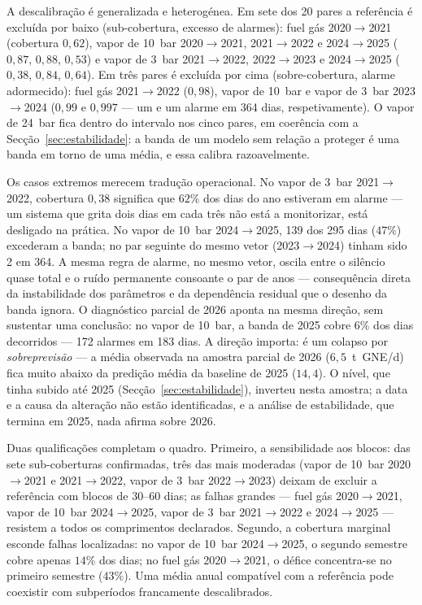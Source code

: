 A descalibração é generalizada e heterogénea. Em sete dos 20 pares a
referência é excluída por baixo (sub-cobertura, excesso de alarmes): fuel gás
2020${\to}$2021 (cobertura $0{,}62$), vapor de 10~bar 2020${\to}$2021,
2021${\to}$2022 e 2024${\to}$2025 ($0{,}87$, $0{,}88$, $0{,}53$) e vapor de
3~bar 2021${\to}$2022, 2022${\to}$2023 e 2024${\to}$2025 ($0{,}38$, $0{,}84$,
$0{,}64$). Em três pares é excluída por cima (sobre-cobertura, alarme
adormecido): fuel gás 2021${\to}$2022 ($0{,}98$), vapor de 10~bar e vapor de
3~bar 2023${\to}$2024 ($0{,}99$ e $0{,}997$ --- um e um alarme em 364 dias,
respetivamente). O vapor de 24~bar fica dentro do intervalo nos cinco pares,
em coerência com a Secção~\ref{sec:estabilidade}: a banda de um modelo sem
relação a proteger é uma banda em torno de uma média, e essa calibra
razoavelmente.

Os casos extremos merecem tradução operacional. No vapor de 3~bar
2021${\to}$2022, cobertura $0{,}38$ significa que $62\%$ dos dias do ano
estiveram em alarme --- um sistema que grita dois dias em cada três não está a
monitorizar, está desligado na prática. No vapor de 10~bar 2024${\to}$2025,
139 dos 295 dias ($47\%$) excederam a banda; no par seguinte do mesmo vetor
(2023${\to}$2024) tinham sido 2 em 364. A mesma regra de alarme, no mesmo
vetor, oscila entre o silêncio quase total e o ruído permanente consoante o
par de anos --- consequência direta da instabilidade dos parâmetros e da
dependência residual que o desenho da banda ignora. O diagnóstico parcial de
2026 aponta na mesma direção, sem sustentar uma conclusão: no vapor de 10~bar,
a banda de 2025 cobre $6\%$ dos dias decorridos --- 172 alarmes em 183 dias.
A direção importa: é um colapso por \emph{sobreprevisão} --- a média
observada na amostra parcial de 2026 ($6{,}5$~t~GNE/d) fica muito abaixo da
predição média da baseline de 2025 ($14{,}4$). O nível, que tinha subido até
2025 (Secção~\ref{sec:estabilidade}), inverteu nesta amostra; a data e a
causa da alteração não estão identificadas, e a análise de estabilidade,
que termina em 2025, nada afirma sobre 2026.

Duas qualificações completam o quadro. Primeiro, a sensibilidade aos blocos:
das sete sub-coberturas confirmadas, três das mais moderadas (vapor de 10~bar
2020${\to}$2021 e 2021${\to}$2022, vapor de 3~bar 2022${\to}$2023) deixam de
excluir a referência com blocos de 30--60 dias; as falhas grandes ---
fuel gás 2020${\to}$2021, vapor de 10~bar 2024${\to}$2025, vapor de 3~bar
2021${\to}$2022 e 2024${\to}$2025 --- resistem a todos os comprimentos
declarados. Segundo, a cobertura marginal esconde falhas localizadas: no
vapor de 10~bar 2024${\to}$2025, o segundo semestre cobre apenas $14\%$ dos
dias; no fuel gás 2020${\to}$2021, o défice concentra-se no primeiro semestre
($43\%$). Uma média anual compatível com a referência pode coexistir com
subperíodos francamente descalibrados.

